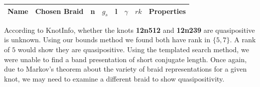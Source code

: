 \documentclass[12pt]{thesis}
\begin{document}
\small
\begin{singlespace}

\begin{center}
\begin{longtable}{ | l | l | c | c | c | c | c | l |}
    \hline
    Name & Chosen Braid & n & $g_{s}$ & l & $\gamma$ & $rk$ & Properties \\
    \hline 
    
    \hline 
\end{longtable}
\end{center}

\end{singlespace}
\normalsize

According to KnotInfo, whether the knots \textbf{12n512} and \textbf{12n239}
are quasipositive is unknown.
Using our bounds method we found both have rank in $\{ 5, 7 \}$.
A rank of $5$ would show they are quasipositive.
Using the templated search method, we were unable
to find a band presentation of short conjugate length.
Once again, due to Markov's theorem about the variety of braid representations
for a given knot, we may need to examine a different braid to show quasipositivity.




\end{document}
